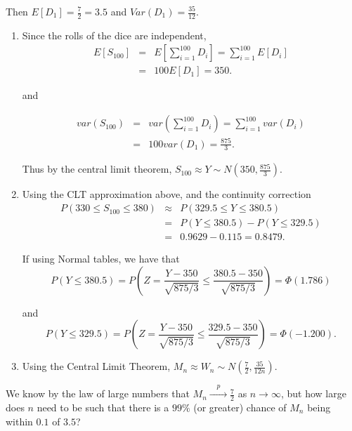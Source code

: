 \documentclass[
]{book}
\begin{document}
Then \(E[D_1] = \frac{7}{2} =3.5\) and \(Var (D_1) = \frac{35}{12}\).

\begin{enumerate}
\def\labelenumi{(\alph{enumi})}
\item
  Since the rolls of the dice are independent,\\

  \begin{eqnarray*} 
  E[S_{100}] &=& E \left[ \sum_{i=1}^{100} D_i \right] =  \sum_{i=1}^{100}E \left[ D_i \right] \\ &=& 100 E[D_1] = 350. \end{eqnarray*}

  and

  \begin{eqnarray*} 
  var(S_{100}) &=& var \left( \sum_{i=1}^{100} D_i \right) =  \sum_{i=1}^{100}var \left(  D_i \right) \\ &=& 100 var(D_1)= \frac{875}{3}. \end{eqnarray*}

  Thus by the central limit theorem, \(S_{100} \approx Y \sim N \left(350, \frac{875}{3} \right)\).
\item
  Using the CLT approximation above, and the continuity correction\\

  \begin{eqnarray*}P(330 \leq S_{100} \leq 380)  &\approx& P(329.5 \leq Y \leq 380.5) \\
  &=& P(Y \leq 380.5) - P(Y \leq 329.5) \\
  &=& 0.9629 - 0.115 = 0.8479. \end{eqnarray*}

  If using Normal tables, we have that\\

  \[ P\left( Y \leq 380.5 \right) = P \left( Z = \frac{Y-350}{\sqrt{875/3}} \leq \frac{380.5-350}{\sqrt{875/3}} \right) = \Phi (1.786)\]

  and\\

  \[ P\left( Y \leq 329.5 \right) = P \left( Z = \frac{Y-350}{\sqrt{875/3}} \leq \frac{329.5-350}{\sqrt{875/3}} \right) = \Phi (-1.200).\]
\item
  Using the Central Limit Theorem, \(M_n \approx W_n \sim N \left(\frac{7}{2}, \frac{35}{12 n} \right)\).
\end{enumerate}

We know by the law of large numbers that \(M_n \xrightarrow{\quad p \quad} \frac{7}{2}\) as \(n \to \infty\), but how large does \(n\) need to be such that there is a \(99\%\) (or greater) chance of \(M_n\) being within \(0.1\) of \(3.5\)?
\end{document}
